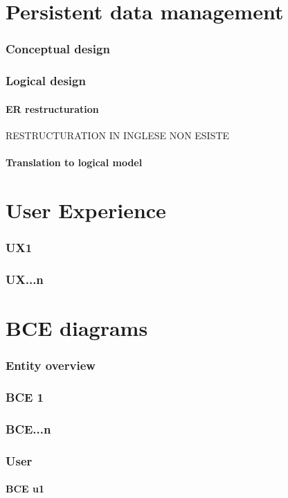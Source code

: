 \documentclass[10pt,a4paper,titlepage]{article}
\begin{document}
\clearpage
\part{Persistent data management}
\section{Conceptual design}
\section{Logical design}
\subsection{ER restructuration}
RESTRUCTURATION IN INGLESE NON ESISTE
\subsection{Translation to logical model}

\clearpage
\part{User Experience}
\section{UX1}
\section{UX...n}

\clearpage
\part{BCE diagrams}
\section{Entity overview}
\section{BCE 1}
\section{BCE...n}
\section{User}
\subsection{BCE u1}
\end{document}
